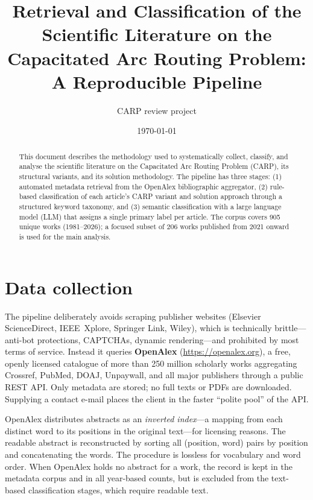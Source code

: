 \documentclass[11pt]{article}
\title{Retrieval and Classification of the Scientific Literature on the\\
Capacitated Arc Routing Problem: A Reproducible Pipeline}
\author{CARP review project}
\date{\today}
\begin{document}
\maketitle

\begin{abstract}
This document describes the methodology used to systematically collect, classify, and
analyse the scientific literature on the Capacitated Arc Routing Problem (CARP), its
structural variants, and its solution methodology. The pipeline has three stages:
(1) automated metadata retrieval from the OpenAlex bibliographic aggregator,
(2) rule-based classification of each article's CARP variant and solution approach
through a structured keyword taxonomy, and (3) semantic classification with a large
language model (LLM) that assigns a single primary label per article. The corpus
covers 905 unique works (1981--2026); a focused subset of 206 works published from
2021 onward is used for the main analysis.
\end{abstract}

\section{Data collection}

The pipeline deliberately avoids scraping publisher websites (Elsevier ScienceDirect,
IEEE~Xplore, Springer Link, Wiley), which is technically brittle---anti-bot
protections, CAPTCHAs, dynamic rendering---and prohibited by most terms of service.
Instead it queries \textbf{OpenAlex} (\url{https://openalex.org}), a free, openly
licensed catalogue of more than 250 million scholarly works aggregating Crossref,
PubMed, DOAJ, Unpaywall, and all major publishers through a public REST API. Only
metadata are stored; no full texts or PDFs are downloaded. Supplying a contact
e-mail places the client in the faster ``polite pool'' of the API.

OpenAlex distributes abstracts as an \emph{inverted index}---a mapping from each
distinct word to its positions in the original text---for licensing reasons. The
readable abstract is reconstructed by sorting all (position, word) pairs by position
and concatenating the words. The procedure is lossless for vocabulary and word order.
When OpenAlex holds no abstract for a work, the record is kept in the metadata corpus
and in all year-based counts, but is excluded from the text-based classification
stages, which require readable text.
\end{document}

